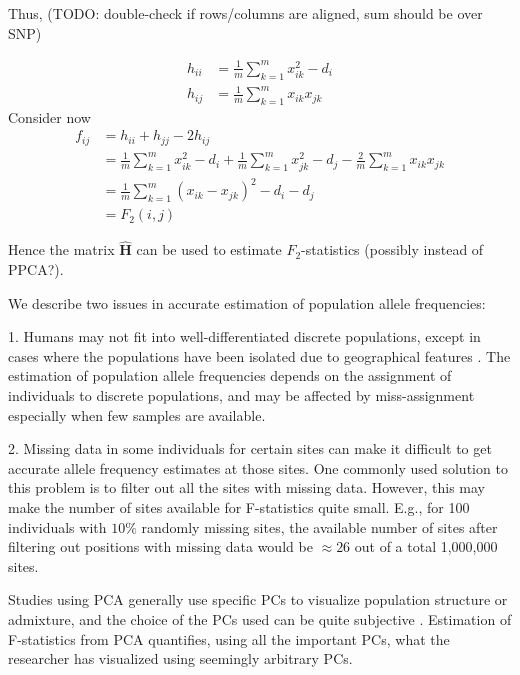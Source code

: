 \documentclass[12pt, letterpaper]{article}
\begin{document}
Thus, (TODO: double-check if rows/columns are aligned, sum should be over SNP)

\begin{subequations}\begin{align}
    h_{ii} &= \frac{1}{m}\sum_{k=1}^m x_{ik}^2 - d_i \\
    h_{ij} &= \frac{1}{m}\sum_{k=1}^m x_{ik}x_{jk} 
\end{align}\end{subequations}
Consider now
\begin{align}
    f_{ij} &= h_{ii} + h_{jj} - 2 h_{ij}\nonumber\\
     &= \frac{1}{m}\sum_{k=1}^m x_{ik}^2 - d_i + \frac{1}{m}\sum_{k=1}^m x_{jk}^2 - d_j - \frac{2}{m}\sum_{k=1}^m x_{ik}x_{jk}\nonumber \\
    &= \frac{1}{m} \sum_{k=1}^m (x_{ik} - x_{jk})^2 - d_i - d_j \\
    &= F_2(i,j)\nonumber
\end{align}

Hence the matrix $\hat{\mathbf{H}}$ can be used to estimate $F_2$-statistics (possibly instead of PPCA?).



We describe two issues in accurate estimation of population allele frequencies:

1. Humans may not fit into well-differentiated discrete populations, except in cases where the populations have been isolated due to geographical features \cite{novembre_genes_2008}. The estimation of population allele frequencies depends on the assignment of individuals to discrete populations, and may be affected by miss-assignment especially when few samples are available. 

2. Missing data in some individuals for certain sites can make it difficult to get accurate allele frequency estimates at those sites. One commonly used solution to this problem is to filter out all the sites with missing data. However, this may make the number of sites available for F-statistics quite small. E.g., for 100 individuals with $10\%$ randomly missing sites, the available number of sites after filtering out positions with missing data would be $\approx26$ out of a total 1,000,000 sites. 

Studies using PCA generally use specific PCs to visualize population structure or admixture, and the choice of the PCs used can be quite subjective \cite{elhaik_principal_2022}. Estimation of F-statistics from PCA quantifies, using all the important PCs, what the researcher has visualized using seemingly arbitrary PCs.
\end{document}
